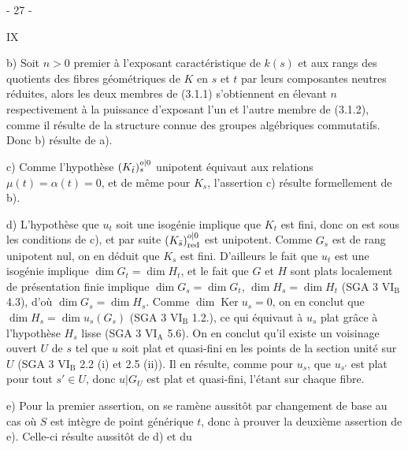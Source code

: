 \begin{center}- 27 -\end{center}\hfill IX

b) Soit $n>0$ premier à l'exposant caractéristique de $k(s)$
et aux rangs des quotients des fibres géométriques de $K$ en $s$ et $t$
par leurs composantes neutres réduites, alors les deux membres de
(3.1.1) s'obtiennent en élevant $n$ respectivement à la puissance
d'exposant l'un et l'autre membre de (3.1.2), comme il résulte de la
structure connue des groupes algébriques commutatifs. Donc b) résulte de a).

c) Comme l'hypothèse $(K_{\bar t})^{{o|0}}_s$ unipotent équivaut aux relations
$\mu(t)=\alpha(t)=0$, et de même pour $K_s$, l'assertion c) résulte formellement
de b).

d) L'hypothèse que $u_t$ soit une isogénie implique que $K_t$ est
fini, donc on est sous les conditions de c), et par suite $(K_{\bar s})^{{o|0}}_{\mathrm{red}}$ est
unipotent. Comme $G_s$ est de rang unipotent nul, on en déduit que $K_s$
est fini. D'ailleurs le fait que $u_t$ est une isogénie implique
$\dim G_t=\dim H_t$, et le fait que $G$ et $H$ sont plats localement de présentation finie implique $\dim G_s=\dim G_t$, $\dim H_s=\dim H_t$ (SGA 3 $\mathrm{VI_B}$ 4.3),
d'où $\dim G_s=\dim H_s$. Comme $\dim\operatorname{Ker}u_s=0$, on en conclut que
$\dim H_s=\dim u_s(G_s)$ (SGA 3 $\mathrm{VI_B}$ 1.2.), ce qui équivaut à $u_s$ plat
grâce à l'hypothèse $H_s$ lisse (SGA 3 $\mathrm{VI_A}$ 5.6). On en conclut qu'il
existe un voisinage ouvert $U$ de $s$ tel que $u$ soit plat et quasi-fini
en les points de la section unité sur $U$ (SGA 3 $\mathrm{VI_B}$ 2.2 (i) et 2.5 (ii)).
Il en résulte, comme pour $u_s$, que $u_{s'}$ est plat pour tout $s'\in U$, donc
$u|G_U$ est plat et quasi-fini, l'étant sur chaque fibre.

e) Pour la premier assertion, on se ramène aussitôt par
changement de base au cas où $S$ est intègre de point générique $t$, donc
à prouver la deuxième assertion de e). Celle-ci résulte aussitôt de d) et du
